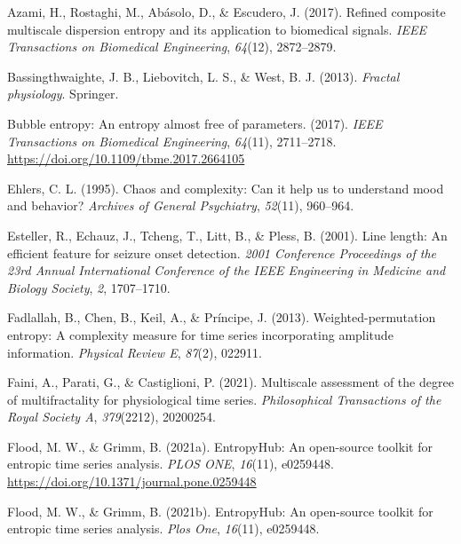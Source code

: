 \documentclass[
  man]{apa6}
\newlength{\cslhangindent}
\newlength{\cslentryspacingunit} %
\newenvironment{CSLReferences}[2] %
 {%
  \setlength{\parindent}{0pt}
  \ifodd #1
  \let\oldpar\par
  \def\par{\hangindent=\cslhangindent\oldpar}
  \fi
  \setlength{\parskip}{#2\cslentryspacingunit}
 }%
 {}
\begin{document}
\hypertarget{refs}{}
\begin{CSLReferences}{1}{0}
\leavevmode{}%
Azami, H., Rostaghi, M., Abásolo, D., \& Escudero, J. (2017). Refined composite multiscale dispersion entropy and its application to biomedical signals. \emph{IEEE Transactions on Biomedical Engineering}, \emph{64}(12), 2872--2879.

\leavevmode{}%
Bassingthwaighte, J. B., Liebovitch, L. S., \& West, B. J. (2013). \emph{Fractal physiology}. Springer.

\leavevmode{}%
Bubble entropy: An entropy almost free of parameters. (2017). \emph{IEEE Transactions on Biomedical Engineering}, \emph{64}(11), 2711--2718. \url{https://doi.org/10.1109/tbme.2017.2664105}

\leavevmode{}%
Ehlers, C. L. (1995). Chaos and complexity: Can it help us to understand mood and behavior? \emph{Archives of General Psychiatry}, \emph{52}(11), 960--964.

\leavevmode{}%
Esteller, R., Echauz, J., Tcheng, T., Litt, B., \& Pless, B. (2001). Line length: An efficient feature for seizure onset detection. \emph{2001 Conference Proceedings of the 23rd Annual International Conference of the IEEE Engineering in Medicine and Biology Society}, \emph{2}, 1707--1710.

\leavevmode{}%
Fadlallah, B., Chen, B., Keil, A., \& Príncipe, J. (2013). Weighted-permutation entropy: A complexity measure for time series incorporating amplitude information. \emph{Physical Review E}, \emph{87}(2), 022911.

\leavevmode{}%
Faini, A., Parati, G., \& Castiglioni, P. (2021). Multiscale assessment of the degree of multifractality for physiological time series. \emph{Philosophical Transactions of the Royal Society A}, \emph{379}(2212), 20200254.

\leavevmode{}%
Flood, M. W., \& Grimm, B. (2021a). EntropyHub: An open-source toolkit for entropic time series analysis. \emph{PLOS ONE}, \emph{16}(11), e0259448. \url{https://doi.org/10.1371/journal.pone.0259448}

\leavevmode{}%
Flood, M. W., \& Grimm, B. (2021b). EntropyHub: An open-source toolkit for entropic time series analysis. \emph{Plos One}, \emph{16}(11), e0259448.


\end{CSLReferences}
\end{document}
